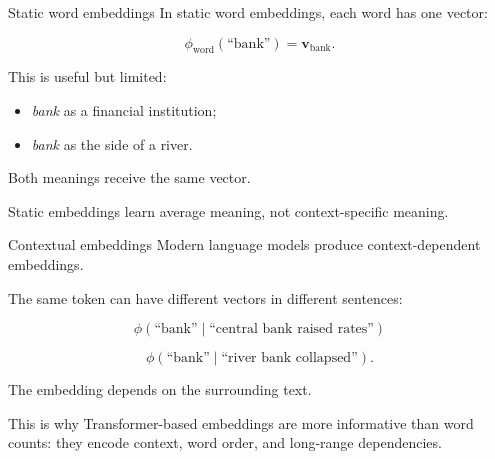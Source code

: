 \documentclass[aspectratio=169]{beamer}
\newcommand{\vect}[1]{\boldsymbol{#1}}
\begin{document}
\begin{frame}{Static word embeddings}
\large
In static word embeddings, each word has one vector:

\[
\phi_{\text{word}}(\text{``bank''}) = \vect{v}_{\text{bank}}.
\]

\vspace{0.25cm}

This is useful but limited:

\begin{itemize}
  \item \textit{bank} as a financial institution;
  \item \textit{bank} as the side of a river.
\end{itemize}

\vspace{0.25cm}

Both meanings receive the same vector.

\vspace{0.25cm}

\begin{redbox}
Static embeddings learn average meaning, not context-specific meaning.
\end{redbox}
\end{frame}

\begin{frame}{Contextual embeddings}
\large
Modern language models produce context-dependent embeddings.

\vspace{0.2cm}

The same token can have different vectors in different sentences:

\[
\phi(\text{``bank''} \mid \text{``central bank raised rates''})
\]

\[
\phi(\text{``bank''} \mid \text{``river bank collapsed''}).
\]

\vspace{0.3cm}

The embedding depends on the surrounding text.

\vspace{0.2cm}

\begin{bluebox}
This is why Transformer-based embeddings are more informative than word counts: they encode context, word order, and long-range dependencies.
\end{bluebox}
\end{frame}
\end{document}
